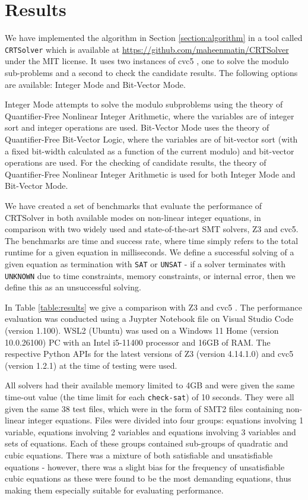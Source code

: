 \section{Results}
\label{section:results}

We have implemented the algorithm in Section \ref{section:algorithm}
in a tool called \texttt{CRTSolver} which is available at
\url{https://github.com/maheenmatin/CRTSolver} under the MIT license.
%
It uses two instances of cvc5 \cite{DBLP:conf/tacas/BarbosaBBKLMMMN22}, one to solve the modulo sub-problems
and a second to check the candidate results.  The following options
are available: Integer Mode and Bit-Vector Mode. 

Integer Mode attempts to
solve the modulo subproblems using the theory of Quantifier-Free Nonlinear
Integer Arithmetic, where the variables are of integer sort and integer
operations are used. 
Bit-Vector Mode uses the theory of Quantifier-Free
Bit-Vector Logic, where the variables are of bit-vector sort (with a fixed
bit-width calculated as a function of the current modulo) and bit-vector
operations are used.
For the checking of candidate results, the theory of Quantifier-Free
Nonlinear Integer Arithmetic is used for both Integer Mode and Bit-Vector
Mode.

We have created a set of benchmarks that evaluate the performance of CRTSolver 
in both available modes on non-linear integer equations, in comparison with two
widely used and state-of-the-art SMT solvers, Z3 and cvc5.
The benchmarks are time and success rate, where time simply refers to the total runtime
for a given equation in milliseconds. We define a successful solving of a given
equation as termination with \texttt{SAT} or \texttt{UNSAT} - if a solver terminates
with \texttt{UNKNOWN} due to time constraints, memory constraints, or internal error,
then we define this as an unsuccessful solving.

In Table \ref{table:results} we give a comparison with Z3 \cite{10.1007/978-3-540-78800-3_24} and cvc5 \cite{DBLP:conf/tacas/BarbosaBBKLMMMN22}.
The performance evaluation was conducted using a Juypter Notebook file on Visual Studio Code (version 1.100).
WSL2 (Ubuntu) was used on a Windows 11 Home (version 10.0.26100) PC with an Intel i5-11400 processor and 
16GB of RAM. The respective Python APIs for the latest versions of Z3 (version 4.14.1.0) and cvc5 
(version 1.2.1) at the time of testing were used.

All solvers had their available memory limited to 4GB and were given the same time-out value 
(the time limit for each \texttt{check-sat}) of 10 seconds.
They were all given the same 38 test 
files, which were in the form of SMT2 files containing non-linear integer equations. Files were divided into four 
groups: equations involving 1 variable, equations involving 2 variables and equations involving 3 variables and sets of equations. 
Each of these groups contained sub-groups of quadratic and cubic equations. There was a mixture of both 
satisfiable and unsatisfiable equations - however, there was a slight bias for the frequency of unsatisfiable 
cubic equations as these were found to be the most demanding equations, thus making them especially suitable 
for evaluating performance.

